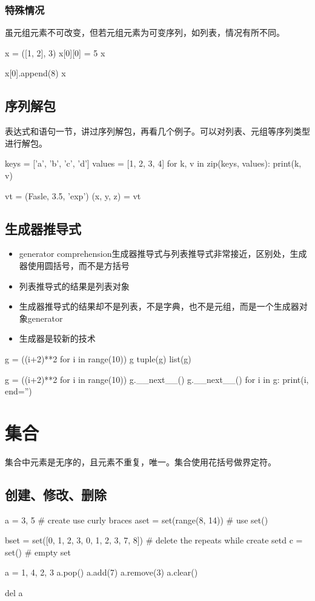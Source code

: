 \subsubsection{特殊情况}
虽元组元素不可改变，但若元组元素为可变序列，如列表，情况有所不同。
\begin{python}
x = ([1, 2], 3)
x[0][0] = 5
x

x[0].append(8)
x
\end{python}
\subsection{序列解包}
表达式和语句一节，讲过序列解包，再看几个例子。可以对列表、元组等序列类型进行解包。
\begin{python}
keys = ['a', 'b', 'c', 'd']
values = [1, 2, 3, 4]
for k, v in zip(keys, values):
    print(k, v)

vt = (Fasle, 3.5, 'exp')
(x, y, z) = vt
\end{python}
\subsection{生成器推导式}
\begin{itemize}
\item generator comprehension生成器推导式与列表推导式非常接近，区别处，生成器使用圆括号，而不是方括号
\item 列表推导式的结果是列表对象
\item 生成器推导式的结果却不是列表，不是字典，也不是元组，而是一个生成器对象generator
\item 生成器是较新的技术
\end{itemize}
\begin{python}
g = ((i+2)**2 for i in range(10))
g
tuple(g)
list(g)

g = ((i+2)**2 for i in range(10))
g.__next__()
g.__next__()
for i in g:
    print(i, end='')
\end{python}
\section{集合}
集合中元素是无序的，且元素不重复，唯一。集合使用花括号{}做界定符。
\subsection{创建、修改、删除}
\begin{python}
  a = {3, 5}  # create use curly braces
  aset = set(range(8, 14))  # use set()

  bset = set([0, 1, 2, 3, 0, 1, 2, 3, 7, 8]) # delete the repeats while create setd 
  c = set()  #  empty set
  
  a = {1, 4, 2, 3}
  a.pop()  
  a.add(7) 
  a.remove(3)  
  a.clear() 
  
  del a 
\end{python}
